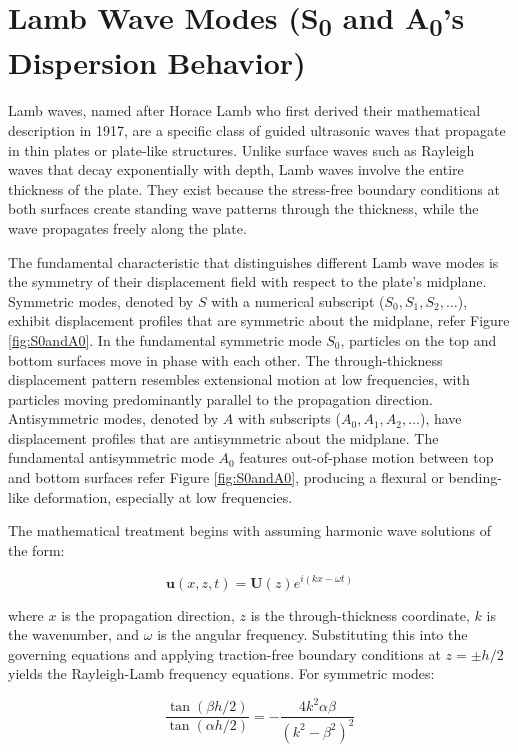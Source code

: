 \documentclass[12pt,a4paper]{report}
\begin{document}
\section{Lamb Wave Modes (S\textsubscript{0} and A\textsubscript{0}'s Dispersion Behavior)}

Lamb waves, named after Horace Lamb who first derived their mathematical description in 1917, are a specific class of guided ultrasonic waves that propagate in thin plates or plate-like structures. Unlike surface waves such as Rayleigh waves that decay exponentially with depth, Lamb waves involve the entire thickness of the plate. They exist because the stress-free boundary conditions at both surfaces create standing wave patterns through the thickness, while the wave propagates freely along the plate.

The fundamental characteristic that distinguishes different Lamb wave modes is the symmetry of their displacement field with respect to the plate's midplane. Symmetric modes, denoted by $S$ with a numerical subscript ($S_0, S_1, S_2, \ldots$), exhibit displacement profiles that are symmetric about the midplane, refer Figure \ref{fig:S0andA0}. In the fundamental symmetric mode $S_0$, particles on the top and bottom surfaces move in phase with each other. The through-thickness displacement pattern resembles extensional motion at low frequencies, with particles moving predominantly parallel to the propagation direction. Antisymmetric modes, denoted by $A$ with subscripts ($A_0, A_1, A_2, \ldots$), have displacement profiles that are antisymmetric about the midplane. The fundamental antisymmetric mode $A_0$ features out-of-phase motion between top and bottom surfaces refer Figure \ref{fig:S0andA0}, producing a flexural or bending-like deformation, especially at low frequencies.

The mathematical treatment begins with assuming harmonic wave solutions of the form:

\begin{equation}
\mathbf{u}(x, z, t) = \mathbf{U}(z)e^{i(kx - \omega t)}
\end{equation}

where $x$ is the propagation direction, $z$ is the through-thickness coordinate, $k$ is the wavenumber, and $\omega$ is the angular frequency. Substituting this into the governing equations and applying traction-free boundary conditions at $z = \pm h/2$ yields the Rayleigh-Lamb frequency equations. For symmetric modes:

\begin{equation}
\frac{\tan(\beta h/2)}{\tan(\alpha h/2)} = -\frac{4k^2 \alpha \beta}{(k^2 - \beta^2)^2}
\end{equation}
\end{document}
